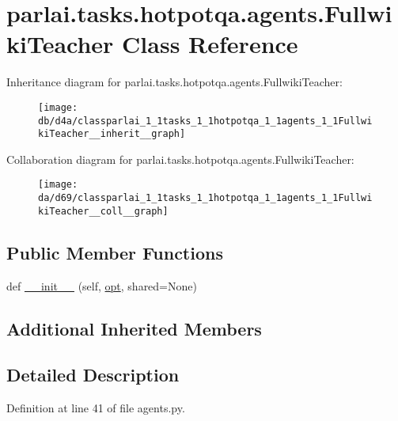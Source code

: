 \hypertarget{classparlai_1_1tasks_1_1hotpotqa_1_1agents_1_1FullwikiTeacher}{}\section{parlai.\+tasks.\+hotpotqa.\+agents.\+Fullwiki\+Teacher Class Reference}
\label{classparlai_1_1tasks_1_1hotpotqa_1_1agents_1_1FullwikiTeacher}


Inheritance diagram for parlai.\+tasks.\+hotpotqa.\+agents.\+Fullwiki\+Teacher\+:\nopagebreak
\begin{figure}[H]
\begin{center}
\leavevmode
\texttt{[image: db/d4a/classparlai\_1\_1tasks\_1\_1hotpotqa\_1\_1agents\_1\_1FullwikiTeacher\_\_inherit\_\_graph]}
\end{center}
\end{figure}


Collaboration diagram for parlai.\+tasks.\+hotpotqa.\+agents.\+Fullwiki\+Teacher\+:\nopagebreak
\begin{figure}[H]
\begin{center}
\leavevmode
\texttt{[image: da/d69/classparlai\_1\_1tasks\_1\_1hotpotqa\_1\_1agents\_1\_1FullwikiTeacher\_\_coll\_\_graph]}
\end{center}
\end{figure}
\subsection*{Public Member Functions}
\begin{DoxyCompactItemize}
\item 
def \hyperlink{classparlai_1_1tasks_1_1hotpotqa_1_1agents_1_1FullwikiTeacher_a7e12fc08024330f828800caee978f7d7}{\+\_\+\+\_\+init\+\_\+\+\_\+} (self, \hyperlink{classparlai_1_1core_1_1agents_1_1Teacher_a3ce6243860ce978a897922863ed32fa4}{opt}, shared=None)
\end{DoxyCompactItemize}
\subsection*{Additional Inherited Members}


\subsection{Detailed Description}


Definition at line 41 of file agents.\+py.



